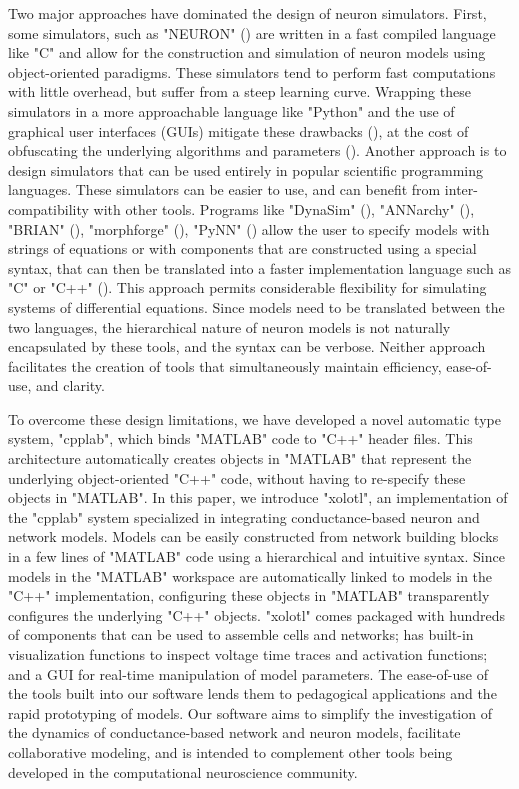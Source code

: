 \documentclass{frontiersSCNS} %
\begin{document}
Two major approaches have dominated the design of neuron simulators. First, some simulators, such as "NEURON" (\cite{hinesNEURONSimulationEnvironment1997}) are written in a fast compiled language like "C" and allow for the construction and simulation of neuron models using object-oriented paradigms. These simulators tend to perform fast computations with little overhead, but suffer from a steep learning curve. Wrapping these simulators in a more approachable language like "Python" and the use of graphical user interfaces (GUIs) mitigate these drawbacks (\cite{hinesNEURONPython2009}), at the cost of obfuscating the underlying algorithms and parameters (\cite{bretteSimulationNetworksSpiking2007, hinesNEURONPython2009}). Another approach is to design simulators that can be used entirely in popular scientific programming languages. These simulators can be easier to use, and can benefit from inter-compatibility with other tools. Programs like "DynaSim" (\cite{sherfeyDynaSimMATLABToolbox2018}), "ANNarchy" (\cite{vitayANNarchyCodeGeneration2015}), "BRIAN" (\cite{stimbergBrianSecondComing2013}), "morphforge" (\cite{hullMorphforgeToolboxSimulating2014}), "PyNN" (\cite{davisonPyNNCommonInterface2009}) allow the user to specify models with strings of equations or with components that are constructed using a special syntax, that can then be translated into a faster implementation language such as "C" or "C++" (\cite{stimbergEquationorientedSpecificationNeural2014}). This approach permits considerable flexibility for simulating systems of differential equations. Since models need to be translated between the two languages, the hierarchical nature of neuron models is not naturally encapsulated by these tools, and the syntax can be verbose. Neither approach facilitates the creation of tools that simultaneously maintain efficiency, ease-of-use, and clarity.

To overcome these design limitations, we have developed a novel automatic type system, "cpplab", which binds "MATLAB" code to "C++" header files. This architecture automatically creates objects in "MATLAB" that represent the underlying object-oriented "C++" code, without having to re-specify these objects in "MATLAB". In this paper, we introduce "xolotl", an implementation of the "cpplab" system specialized in integrating conductance-based neuron and network models. Models can be easily constructed from network building blocks in a few lines of "MATLAB" code using a hierarchical and intuitive syntax. Since models in the "MATLAB" workspace are automatically linked to models in the "C++" implementation, configuring these objects in "MATLAB" transparently configures the underlying "C++" objects. "xolotl" comes packaged with hundreds of components that can be used to assemble cells and networks;  has built-in visualization functions to inspect voltage time traces and activation functions; and a GUI for real-time manipulation of model parameters. The ease-of-use of the tools built into our software lends them to pedagogical applications and the rapid prototyping of models. Our software aims to simplify the investigation of the dynamics of conductance-based network and neuron models, facilitate collaborative modeling, and is intended to complement other tools being developed in the computational neuroscience community.
\end{document}
